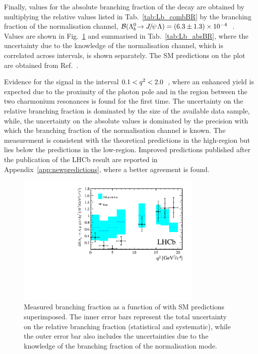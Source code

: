Finally, values for the absolute branching fraction of the \decay{\Lb}{\Lz\mumu} decay are obtained by multiplying 
the relative values listed in Tab.~\ref{tab:Lb_combBR} by the branching fraction of the normalisation channel,
$\BF(\decay{\Lb}{\jpsi\Lz})=(6.3\pm1.3)\times10^{-4}$~\cite{PDG2014}.
Values are shown in Fig.~\ref{fig:Lb_absBR} and summarised in Tab.~\ref{tab:Lb_absBR}, where the uncertainty
due to the knowledge of the normalisation channel, which is correlated across \qsq intervals, is shown separately.
The SM predictions on the plot are obtained from Ref.~\cite{Detmold:2012vy}.  

Evidence for the signal in the interval \mbox{$0.1 < q^2 < 2.0$~\gevgevcccc}, where an enhanced yield is expected 
due to the proximity of the photon pole and in the region between the two charmonium resonances is found for the first time. 
The uncertainty on the relative branching fraction is dominated by the size of the available data sample, while,
the uncertainty on the absolute values is dominated by the precision with which the branching 
fraction of the normalisation channel is known.
The measurement is consistent with the theoretical predictions in the high-\qsq region 
but lies below the predictions in the low-\qsq region. Improved predictions published after the publication 
of the LHCb result are reported in Appendix~\ref{app:newpredictions}, where a better agreement is found.

\begin{figure}
\centering
\includegraphics[width=0.8\textwidth]{Lmumu/figs/paper/figure5.pdf}
\caption{Measured \protect\decay{\Lb}{\Lz\mumu} branching
   fraction as a function of \qsq with SM predictions~\cite{Detmold:2012vy} superimposed.  
   The inner error bars represent the total uncertainty on the relative branching
   fraction (statistical and systematic), while the outer error bar also
   includes the uncertainties due to the knowledge of the branching fraction of the
   normalisation mode.}  
\label{fig:Lb_absBR}
\end{figure}

